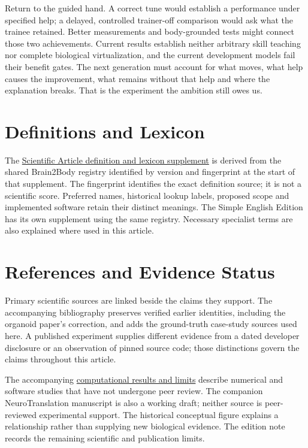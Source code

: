 Return to the guided hand. A correct tune would establish a performance under
specified help; a delayed, controlled trainer-off comparison would ask what the
trainee retained. Better measurements and body-grounded tests might connect
those two achievements. Current results establish neither arbitrary skill
teaching nor complete biological virtualization, and the current development
models fail their benefit gates. The next generation must account for what
moves, what help causes the improvement, what remains without that help and
where the explanation breaks. That is the experiment the ambition still owes
us.\par

\section{Definitions and Lexicon}

The \hyperref[programme-definitions]{Scientific Article definition and lexicon supplement} is derived from the shared Brain2Body registry identified by version and fingerprint at the start of that supplement. The fingerprint identifies the exact definition source; it is not a scientific score. Preferred names, historical lookup labels, proposed scope and implemented software retain their distinct meanings. The Simple English Edition has its own supplement using the same registry. Necessary specialist terms are also explained where used in this article.\par

\section{References and Evidence Status}

Primary scientific sources are linked beside the claims they support. The accompanying bibliography preserves verified earlier identities, including the organoid paper's correction, and adds the ground-truth case-study sources used here. A published experiment supplies different evidence from a dated developer disclosure or an observation of pinned source code; those distinctions govern the claims throughout this article.\par

The accompanying \href{research-evidence.json}{computational results and limits}
describe numerical and software studies that have not undergone peer review.
The companion NeuroTranslation manuscript is also a working draft; neither
source is peer-reviewed experimental support. The historical conceptual figure
explains a relationship rather than supplying new biological evidence. The
edition note records the remaining scientific and publication limits.\par

